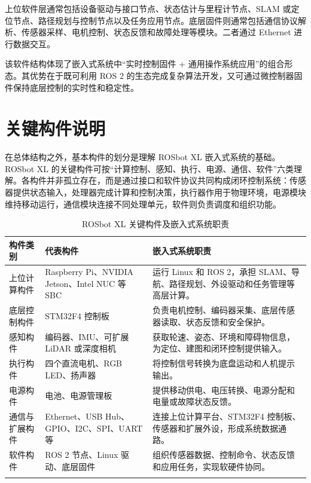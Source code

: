 \documentclass[UTF8,a4paper,12pt]{ctexrep}
\begin{document}
上位软件层通常包括设备驱动与接口节点、状态估计与里程计节点、SLAM 或定位节点、路径规划与控制节点以及任务应用节点。底层固件则通常包括通信协议解析、传感器采样、电机控制、状态反馈和故障处理等模块。二者通过 Ethernet 进行数据交互。

该软件结构体现了嵌入式系统中“实时控制固件 + 通用操作系统应用”的组合形态。其优势在于既可利用 ROS 2 的生态完成复杂算法开发，又可通过微控制器固件保持底层控制的实时性和稳定性。

\section{关键构件说明}

在总体结构之外，基本构件的划分是理解 ROSbot XL 嵌入式系统的基础。ROSbot XL 的关键构件可按“计算控制、感知、执行、电源、通信、软件”六类理解。各构件并非孤立存在，而是通过接口和软件协议共同构成闭环控制系统：传感器提供状态输入，处理器完成计算和控制决策，执行器作用于物理环境，电源模块维持移动运行，通信模块连接不同处理单元，软件则负责调度和组织功能。

\begin{table}[H]
  \centering
  \caption{ROSbot XL 关键构件及嵌入式系统职责}
  \label{tab:key-components}
  \small
  \begin{tabularx}{\textwidth}{L{3.0cm}L{3.6cm}Y}
    \toprule
    \textbf{构件类别} & \textbf{代表构件} & \textbf{嵌入式系统职责} \\
    \midrule
    上位计算构件 & Raspberry Pi、NVIDIA Jetson、Intel NUC 等 SBC & 运行 Linux 和 ROS 2，承担 SLAM、导航、路径规划、外设驱动和任务管理等高层计算。 \\
    底层控制构件 & STM32F4 控制板 & 负责电机控制、编码器采集、底层传感器读取、状态反馈和安全保护。 \\
    感知构件 & 编码器、IMU、可扩展 LiDAR 或深度相机 & 获取轮速、姿态、环境和障碍物信息，为定位、建图和闭环控制提供输入。 \\
    执行构件 & 四个直流电机、RGB LED、扬声器 & 将控制信号转换为底盘运动和人机提示输出。 \\
    电源构件 & 电池、电源管理板 & 提供移动供电、电压转换、电源分配和电量或故障状态反馈。 \\
    通信与扩展构件 & Ethernet、USB Hub、GPIO、I2C、SPI、UART 等 & 连接上位计算平台、STM32F4 控制板、传感器和扩展外设，形成系统数据通路。 \\
    软件构件 & ROS 2 节点、Linux 驱动、底层固件 & 组织传感器数据、控制命令、状态反馈和应用任务，实现软硬件协同。 \\
    \bottomrule
  \end{tabularx}
\end{table}
\end{document}
